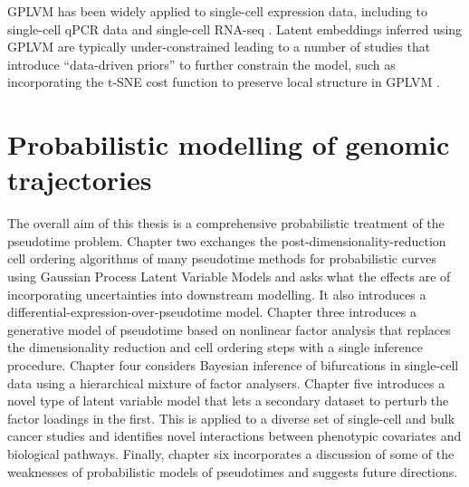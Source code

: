 GPLVM has been widely applied to single-cell expression data, including to single-cell qPCR data \cite{buettner2012novel} and single-cell RNA-seq \cite{campbell2016order,macaulay2016single}. Latent embeddings inferred using GPLVM are typically under-constrained leading to a number of studies that introduce ``data-driven priors'' to further constrain the model, such as incorporating the t-SNE cost function to preserve local structure in GPLVM \cite{van2009preserving}.

\section{Probabilistic modelling of genomic trajectories}

The overall aim of this thesis is a comprehensive probabilistic treatment of the pseudotime problem. Chapter two exchanges the post-dimensionality-reduction cell ordering algorithms of many pseudotime methods for probabilistic curves using Gaussian Process Latent Variable Models and asks what the effects are of incorporating uncertainties into downstream modelling. It also introduces a differential-expression-over-pseudotime model.
Chapter three introduces a generative model of pseudotime based on nonlinear factor analysis that replaces the dimensionality reduction and cell ordering steps with a single inference procedure.
Chapter four considers Bayesian inference of bifurcations in single-cell data using a hierarchical mixture of factor analysers.
Chapter five introduces a novel type of latent variable model that lets a secondary dataset to perturb the factor loadings in the first. This is applied to a diverse set of single-cell and bulk cancer studies and identifies novel interactions between phenotypic covariates and biological pathways.
Finally, chapter six incorporates a discussion of some of the weaknesses of probabilistic models of pseudotimes and suggests future directions.
